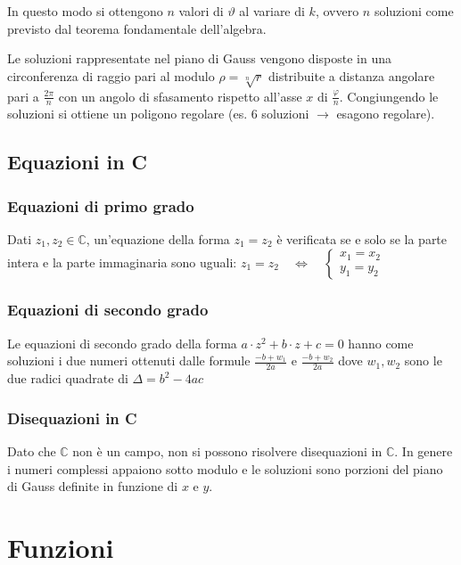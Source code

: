 \documentclass[a4paper]{article}
\begin{document}
In questo modo si ottengono \(n\) valori di \(\vartheta\) al variare di \(k\), ovvero \(n\) soluzioni come previsto dal teorema fondamentale dell'algebra.

Le soluzioni rappresentate nel piano di Gauss vengono disposte in una circonferenza di raggio pari al modulo \(\rho = \sqrt[n]{r}\) distribuite
a distanza angolare pari a \(\frac{2 \pi}{n}\) con un angolo di sfasamento rispetto all'asse \(x\) di \(\frac{\varphi}{n}\). 
Congiungendo le soluzioni si ottiene un poligono regolare (es. 6 soluzioni \(\to\) esagono regolare).

\subsection{Equazioni in C}
\subsubsection*{Equazioni di primo grado}
Dati \(z_1, z_2 \in \mathbb{C}\), un'equazione della forma \(z_1 = z_2\) è verificata se e solo se la parte intera e la parte immaginaria sono
uguali: \(z_1 = z_2 \quad \Leftrightarrow \quad \begin{cases}
	x_1 = x_2 \\
	y_1 = y_2
\end{cases}\) 

\subsubsection*{Equazioni di secondo grado}
Le equazioni di secondo grado della forma \(a \cdot z^2 + b \cdot z + c = 0\) hanno come soluzioni i due numeri ottenuti dalle formule
\(\displaystyle \frac{-b + w_1}{2a}\) e \(\displaystyle \frac{-b + w_2}{2a}\) dove \(w_1, w_2\) sono le due radici quadrate di \(\Delta = b^2 - 4ac\)

\subsubsection*{Disequazioni in C}
Dato che \(\mathbb{C}\) non è un campo, non si possono risolvere disequazioni in \(\mathbb{C}\). In genere i numeri complessi appaiono
sotto modulo e le soluzioni sono porzioni del piano di Gauss definite in funzione di \(x\) e \(y\).

\newpage


\section{Funzioni}
\end{document}
